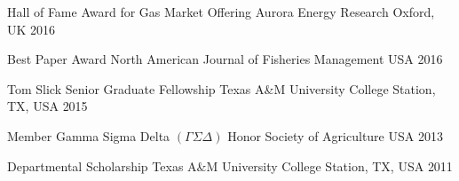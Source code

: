 
\begin{cvhonors}

  \cvhonor
    {Hall of Fame Award for Gas Market Offering} %
    {Aurora Energy Research} %
    {Oxford, UK} %
    {2016} %

  \cvhonor
    {Best Paper Award} %
    {North American Journal of Fisheries Management} %
    {USA} %
    {2016} %

  \cvhonor
    {Tom Slick Senior Graduate Fellowship} %
    {Texas A\&M University} %
    {College Station, TX, USA} %
    {2015} %

  \cvhonor
    {Member} %
    {Gamma Sigma Delta $(\Gamma \Sigma \Delta)$ Honor Society of Agriculture} %
    {USA} %
    {2013} %

  \cvhonor
    {Departmental Scholarship} %
    {Texas A\&M University} %
    {College Station, TX, USA} %
    {2011} %

\end{cvhonors}
